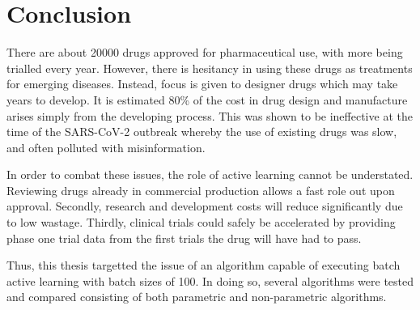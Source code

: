 \chapter{Conclusion}


\graphicspath{{Chapter6/Figs/Vector/}{Chapter6/Figs/}}




There are about 20000 drugs approved for pharmaceutical use, with more being trialled every year. However, there is hesitancy in using these drugs as treatments for emerging diseases. Instead, focus is given to designer drugs which may take years to develop. It is estimated 80\% of the cost in drug design and manufacture arises simply from the developing process. This was shown to be ineffective at the time of the SARS-CoV-2 outbreak whereby the use of existing drugs was slow, and often polluted with misinformation.

In order to combat these issues, the role of active learning cannot be understated. Reviewing drugs already in commercial production allows a fast role out upon approval. Secondly, research and development costs will reduce significantly due to low wastage. Thirdly, clinical trials could safely be accelerated by providing phase one trial data from the first trials the drug will have had to pass.

Thus, this thesis targetted the issue of an algorithm capable of executing batch active learning with batch sizes of 100. In doing so, several algorithms were tested and compared consisting of both parametric and non-parametric algorithms.